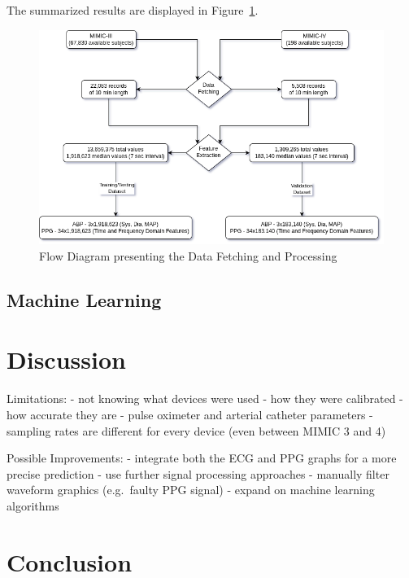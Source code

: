 \documentclass[12pt, bibliography=totoc]{scrartcl}
\begin{document}
    The summarized results are displayed in Figure~\ref{fig:data_flow}.

    \begin{figure}[h]
        \centering
        \includegraphics[scale=0.6]{images/flow_diagrams/flow_diagram}
        \caption{Flow Diagram presenting the Data Fetching and Processing}
        \label{fig:data_flow}
    \end{figure}

    \subsection{Machine Learning}
    \label{subsec:machine_learning}


    \section{Discussion}
    \label{sec:discussion}

    Limitations:
    - not knowing what devices were used
    - how they were calibrated
    - how accurate they are
    - pulse oximeter and arterial catheter parameters
    - sampling rates are different for every device (even between MIMIC 3 and 4)

    Possible Improvements:
    - integrate both the ECG and PPG graphs for a more precise prediction
    - use further signal processing approaches
    - manually filter waveform graphics (e.g.\ faulty PPG signal)
    - expand on machine learning algorithms


    \section{Conclusion}
    \label{sec:conclusion}

    
    
\end{document}
